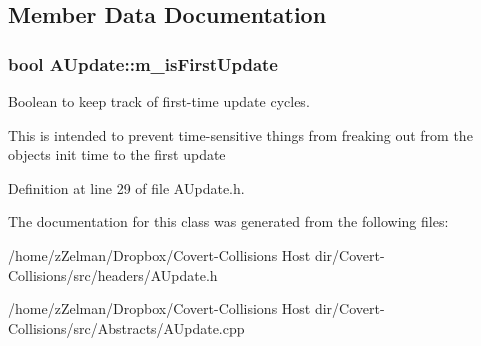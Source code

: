 \subsection{Member Data Documentation}
\hypertarget{classAUpdate_adf0a017c2fd5abd12f64f7f0fd992e66}{
\subsubsection[{m\-\_\-is\-First\-Update}]{\setlength{\rightskip}{0pt plus 5cm}bool A\-Update\-::m\-\_\-is\-First\-Update\hspace{0.3cm}{\ttfamily [protected]}}}\label{classAUpdate_adf0a017c2fd5abd12f64f7f0fd992e66}


Boolean to keep track of first-\/time update cycles. 

This is intended to prevent time-\/sensitive things from freaking out from the objects init time to the first update 

Definition at line 29 of file A\-Update.\-h.



The documentation for this class was generated from the following files\-:\begin{DoxyCompactItemize}
\item 
/home/z\-Zelman/\-Dropbox/\-Covert-\/\-Collisions Host dir/\-Covert-\/\-Collisions/src/headers/A\-Update.\-h\item 
/home/z\-Zelman/\-Dropbox/\-Covert-\/\-Collisions Host dir/\-Covert-\/\-Collisions/src/\-Abstracts/A\-Update.\-cpp\end{DoxyCompactItemize}
